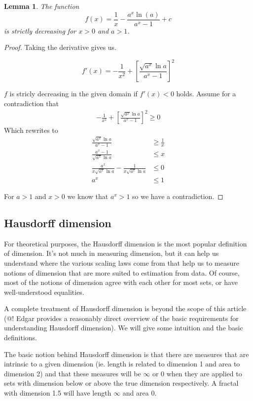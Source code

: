 \documentclass[11pt]{article}
\newtheorem{lma}{Lemma}
\begin{document}
\begin{lma}
\label{monotonicity}
The function
\[
f(x) = \frac{1}{x} - \frac{a^x \ln(a)}{a^x - 1} + c
\]
is strictly decreasing for $ x > 0$ and $ a > 1$.
\end{lma}
\begin{proof}
Taking the derivative gives us. 

\[
f'(x) = -\frac{1}{x^2} + \left [ \frac{\sqrt{a^x}\ln a}{a^x - 1} \right ]^2
\]

$f$ is stricly decreasing in the given domain if $f'(x) < 0$ holds. Assume for a contradiction that
\begin{align*}
-\frac{1}{x^2} + \left [ \frac{\sqrt{a^x}\ln a}{a^x - 1} \right ]^2 \geq 0
\end{align*}
Which rewrites to 
\begin{align*}
\frac{\sqrt{a^x}\ln a}{a^x - 1}  &\geq \frac{1}{x}\\
\frac{a^x - 1}{\sqrt{a^x}\ln a} &\leq x \\
\frac{a^x}{x\sqrt{a^x}\ln a} - \frac{1}{x\sqrt{a^x}\ln a} &\leq 0 \\
a^x &\leq 1
\end{align*}

For $a>1$ and $x>0$ we know that $a^x > 1$ so we have a contradiction.
\end{proof}

\subsection{Hausdorff dimension}
\label{hausdorff-dimension}

For theoretical purposes, the Hausdorff dimension is the most popular definition of dimension. It's not much in measuring dimension, but it can help us understand where the various scaling laws come from that help us to measure notions of dimension that are more suited to estimation from data. Of course, most of the notions of dimension agree with each other for most sets, or have well-understood equalities.

A complete treatment of Hausdorff dimension is beyond the scope of this article (@! Edgar provides a reasonably direct overview of the basic requirements for understanding Hausdorff dimension). We will give some intuition and the basic definitions. 

The basic notion behind Hausdorff dimension is that there are measures that are intrinsic to a given dimension (ie. length is related to dimension 1 and area to dimension 2) and that these measures will be $\infty$ or $0$ when they are applied to sets with dimension below or above the true dimension respectively. A fractal with dimension 1.5 will have length $\infty$ and area $0$.
\end{document}
